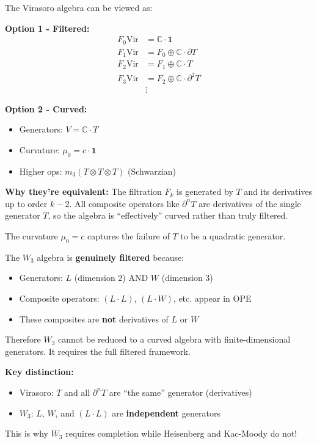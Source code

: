 \begin{example}\label{ex:vir-filtered-to-curved}
The Virasoro algebra can be viewed as:

\textbf{Option 1 - Filtered:}
\begin{align}
F_0\text{Vir} &= \mathbb{C} \cdot \mathbf{1} \\
F_1\text{Vir} &= F_0 \oplus \mathbb{C} \cdot \partial T \\
F_2\text{Vir} &= F_1 \oplus \mathbb{C} \cdot T \\
F_3\text{Vir} &= F_2 \oplus \mathbb{C} \cdot \partial^2 T \\
&\vdots
\end{align}

\textbf{Option 2 - Curved:}
\begin{itemize}
\item Generators: $V = \mathbb{C} \cdot T$
\item Curvature: $\mu_0 = c \cdot \mathbf{1}$
\item Higher ops: $m_3(T \otimes T \otimes T)$ (Schwarzian)
\end{itemize}

\textbf{Why they're equivalent:}
The filtration $F_k$ is generated by $T$ and its derivatives up to order $k-2$. All composite 
operators like $\partial^n T$ are derivatives of the single generator $T$, so the algebra is 
``effectively'' curved rather than truly filtered.

The curvature $\mu_0 = c$ captures the failure of $T$ to be a quadratic generator.
\end{example}

\begin{example}\label{ex:w3-not-curved}
The $W_3$ algebra is \textbf{genuinely filtered} because:
\begin{itemize}
\item Generators: $L$ (dimension 2) AND $W$ (dimension 3)
\item Composite operators: $(L \cdot L)$, $(L \cdot W)$, etc. appear in OPE
\item These composites are \textbf{not} derivatives of $L$ or $W$
\end{itemize}

Therefore $W_3$ cannot be reduced to a curved algebra with finite-dimensional generators. 
It requires the full filtered framework.

\textbf{Key distinction:}
\begin{itemize}
\item Virasoro: $T$ and all $\partial^n T$ are ``the same'' generator (derivatives)
\item $W_3$: $L$, $W$, and $(L \cdot L)$ are \textbf{independent} generators
\end{itemize}

This is why $W_3$ requires completion while Heisenberg and Kac-Moody do not!
\end{example}

